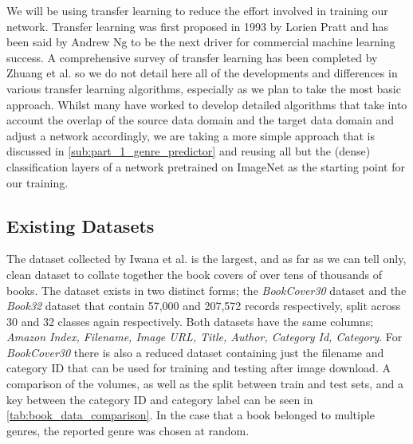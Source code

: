 \documentclass[12pt]{article}
\numberwithin{equation}{section}
\numberwithin{figure}{section}
\begin{document}
We will be using transfer learning to reduce the effort involved in training our network. Transfer learning was first proposed in 1993 by Lorien Pratt \cite{Pratt1993} and has been said by Andrew Ng to be the next driver for commercial machine learning success. A comprehensive survey of transfer learning has been completed by Zhuang et al. \cite{Zhuang2019} so we do not detail here all of the developments and differences in various transfer learning algorithms, especially as we plan to take the most basic approach. Whilst many have worked to develop detailed algorithms that take into account the overlap of the source data domain and the target data domain and adjust a network accordingly, we are taking a more simple approach that is discussed in \cref{sub:part_1_genre_predictor} and reusing all but the (dense) classification layers of a network pretrained on ImageNet as the starting point for our training.
\subsection{Existing Datasets} %
\label{sub:existing_datasets}
The dataset collected by Iwana et al.\cite{KenjiIwana} is the largest, and as far as we can tell only, clean dataset to collate together the book covers of over tens of thousands of books. The dataset exists in two distinct forms; the \emph{BookCover30} dataset and the \emph{Book32} dataset that contain 57,000 and 207,572 records respectively, split across 30 and 32 classes again respectively. Both datasets have the same columns; \emph{Amazon Index, Filename, Image URL, Title, Author, Category Id, Category}. For \emph{BookCover30} there is also a reduced dataset containing just the filename and category ID that can be used for training and testing after image download. A comparison of the volumes, as well as the split between train and test sets, and a key between the category ID and category label can be seen in \cref{tab:book_data_comparison}. In the case that a book belonged to multiple genres, the reported genre was chosen at random.
\end{document}
